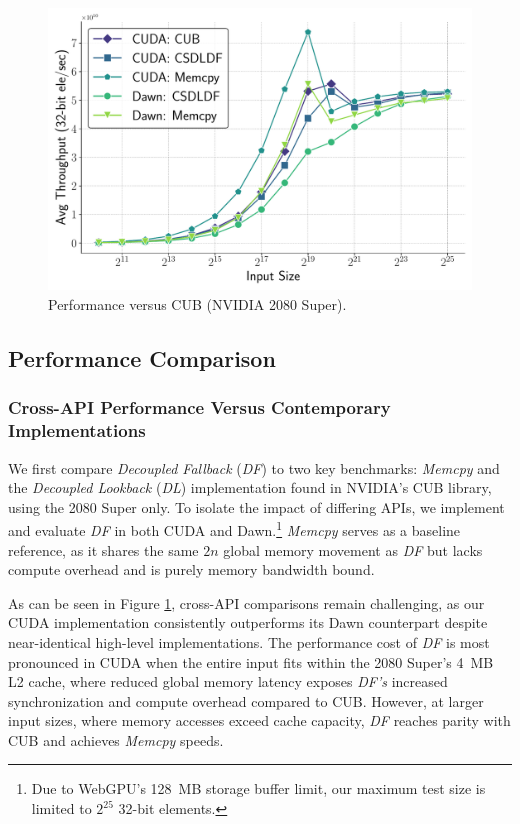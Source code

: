 \documentclass[sigconf,screen]{acmart}
\begin{document}
\begin{figure}[t]
  \centering
  \includegraphics[width=\linewidth]{graphics/cuda_plot.pdf}
  \caption{Performance versus CUB (NVIDIA 2080 Super).}
  \label{fig:cuda}
\end{figure}

\subsection{Performance Comparison}
\subsubsection{Cross-API Performance Versus Contemporary Implementations}
We first compare \emph{Decoupled Fallback} (\emph{DF}) to two key benchmarks: \emph{Memcpy} and the \emph{Decoupled Lookback} (\emph{DL}) implementation found in NVIDIA's CUB library, using the 2080 Super only. To isolate the impact of differing APIs, we implement and evaluate \emph{DF} in both CUDA and Dawn.\footnote{Due to WebGPU's 128~MB storage buffer limit, our maximum test size is limited to $2^{25}$ 32-bit elements.} \emph{Memcpy} serves as a baseline reference, as it shares the same $2n$ global memory movement as \emph{DF} but lacks compute overhead and is purely memory bandwidth bound.

As can be seen in Figure \ref{fig:cuda}, cross-API comparisons remain challenging, as our CUDA implementation consistently outperforms its Dawn counterpart despite near-identical high-level implementations. The performance cost of \emph{DF} is most pronounced in CUDA when the entire input fits within the 2080 Super's 4~MB L2 cache, where reduced global memory latency exposes \emph{DF's} increased synchronization and compute overhead compared to CUB\@. However, at larger input sizes, where memory accesses exceed cache capacity, \emph{DF} reaches parity with CUB and achieves \emph{Memcpy} speeds.
\end{document}
